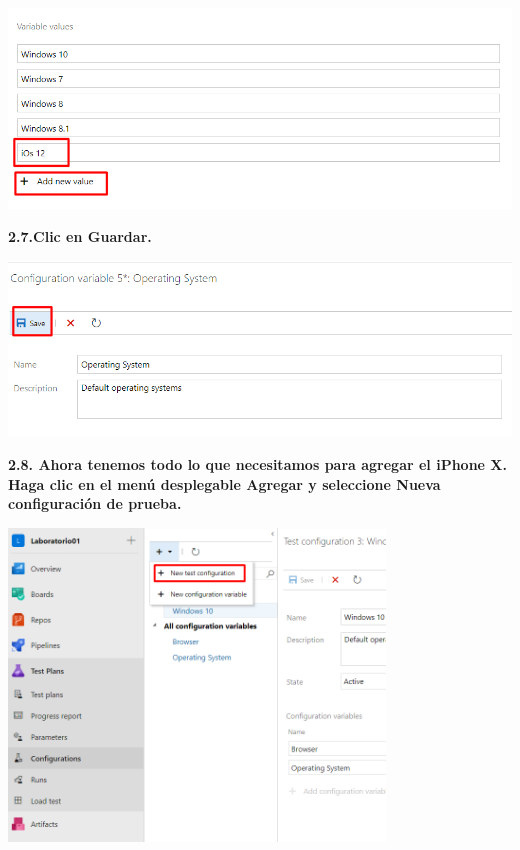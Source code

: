 \documentclass{article}
\begin{document}
    \begin{center}
		\includegraphics[width=14cm]{./images/2.10} 
	\end{center}
	
\textbf{2.7.Clic en Guardar.}

    \begin{center}
		\includegraphics[width=14cm]{./images/2.11} 
	\end{center}
	
	
\newpage
	
\textbf{2.8. Ahora tenemos todo lo que necesitamos para agregar el iPhone X. Haga clic en el menú desplegable Agregar y seleccione Nueva configuración de prueba.}

    \begin{center}
		\includegraphics[width=10cm]{./images/2.12} 
	\end{center}
	
\end{document}
